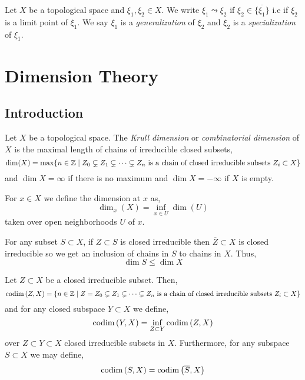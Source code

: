\documentclass[12pt]{article}
\begin{document}
\begin{defn}
Let $X$ be a topological space and $\xi_1, \xi_2 \in X$. We write $\xi_1 \leadsto \xi_2$ if $\xi_2 \in \overline{\{ \xi_1 \}}$ i.e if $\xi_2$ is a limit point of $\xi_1$. We say $\xi_1$ is a \textit{generalization} of $\xi_2$ and $\xi_2$ is a \textit{specialization} of $\xi_1$.
\end{defn}

\section{Dimension Theory}

\subsection{Introduction}

\begin{defn}
Let $X$ be a topological space. The \textit{Krull dimension} or \textit{combinatorial dimension} of $X$ is the maximal length of chains of irreducible closed subsets,
\[ \dim(X) = \max \{ n \in \mathbb{Z} \mid Z_0 \subsetneq Z_1 \subsetneq \cdots \subsetneq Z_n \text{ is a chain of closed irreducible subsets } Z_i \subset X \} \]
and $\dim{X} = \infty$ if there is no maximum and $\dim{X} = -\infty$ if $X$ is empty.
\end{defn}

\begin{defn}
For $x \in X$ we define the dimension at $x$ as,
\[ \dim_{x}(X) = \inf_{x \in U} \dim{(U)} \]
taken over open neighborhoods $U$ of $x$.
\end{defn}

\begin{rmk}
For any subset $S \subset X$, if $Z \subset S$ is closed irreducible then $\overline{Z} \subset X$ is closed irreducible so we get an inclusion of chains in $S$ to chains in $X$. Thus,
\[ \dim{S} \le \dim{X} \]
\end{rmk}

\begin{defn}
Let $Z \subset X$ be a closed irreducible subset. Then,
\[ \mathrm{codim}\left( Z,X \right) = \{ n \in \mathbb{Z} \mid Z = Z_0 \subsetneq Z_1 \subsetneq \cdots \subsetneq Z_n  \text{ is a chain of closed irreducible subsets } Z_i \subset X \} \]
and for any closed subspace $Y \subset X$ we define,
\[ \mathrm{codim}\left( Y, X \right) = \inf_{Z \subset Y} \mathrm{codim}\left( Z, X \right) \]
over $Z \subset Y \subset X$ closed irreducible subsets in $X$. Furthermore, for any subspace $S \subset X$ we may define,
\[ \mathrm{codim}\left( S, X \right) = \mathrm{codim}\left( \overline{S}, X \right) \]
\end{defn}
\end{document}
